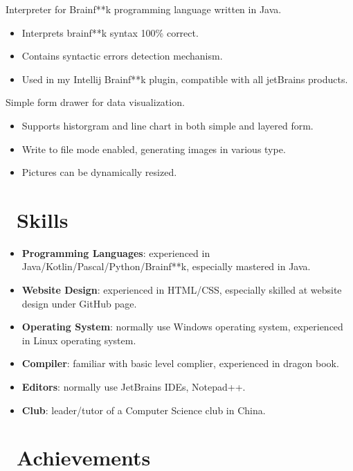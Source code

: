 \documentclass{resume}
\begin{document}
Interpreter for Brainf**k programming language written in Java.
\begin{itemize}
  \item Interprets brainf**k syntax 100\% correct.
  \item Contains syntactic errors detection mechanism.
  \item Used in my Intellij Brainf**k plugin, compatible with all jetBrains products.
\end{itemize}

Simple form drawer for data visualization.
\begin{itemize}
  \item Supports historgram and line chart in both simple and layered form.
  \item Write to file mode enabled, generating images in various type.
  \item Pictures can be dynamically resized.
\end{itemize}

\section{\faCogs\ Skills}
\begin{itemize}[parsep=0.5ex]
  \item \textbf{Programming Languages}:
    experienced in Java/Kotlin/Pascal/Python/Brainf**k, especially mastered in Java.
  \item \textbf{Website Design}:
    experienced in HTML/CSS, especially skilled at website design under GitHub page.
  \item \textbf{Operating System}:
    normally use Windows operating system, experienced in Linux operating system. 
  \item \textbf{Compiler}:
    familiar with basic level complier, experienced in dragon book.  
  \item \textbf{Editors}:
    normally use JetBrains IDEs, Notepad++.
  \item \textbf{Club}:
    leader/tutor of a Computer Science club in China.
\end{itemize}

\section{\faHeartO\ Achievements}
\end{document}
